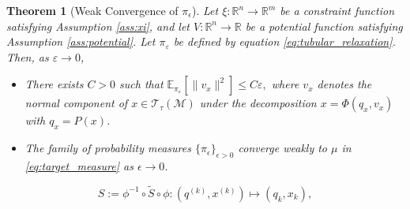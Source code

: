 \documentclass[10pt,a4paper]{amsart}
\newtheorem{theorem}{Theorem}
\begin{document}
\begin{theorem}[Weak Convergence of $\pi_\epsilon$]
\label{thm:tubular_convergence}
Let $\xi: \mathbb{R}^n \to \mathbb{R}^m$ be a constraint function satisfying Assumption \ref{ass:xi}, and let $V: \mathbb{R}^n \to \mathbb{R}$ be a potential function satisfying Assumption \ref{ass:potential}. Let $\pi_\varepsilon$ be defined by equation \eqref{eq:tubular_relaxation}. Then, as $\varepsilon \to 0$,
\begin{itemize}
    \item[(i)] There exists $C > 0$ such that
    \(
    \mathbb{E}_{\pi_\varepsilon}\left[\|v_x\|^2\right] \le C\varepsilon,
    \)
    where $v_x$ denotes the normal component of $x\in\mathcal{T}_\tau(\mathcal{M})$ under the decomposition $x = \Phi(q_x, v_x)$ with $q_x = P(x)$.
    
    \item[(ii)] The family of probability measures $\{\pi_\epsilon\}_{\epsilon>0}$ converge weakly to $\mu$ in \eqref{eq:target_measure} as $\epsilon \rightarrow 0$.
\end{itemize}
\end{theorem}

\begin{equation}\label{eq:exachange}
    S := \phi^{-1}\circ \widetilde S\circ \phi :
(q^{(k)},x^{(k)}) \longmapsto (q_k, x_k),
\end{equation}
\end{document}
